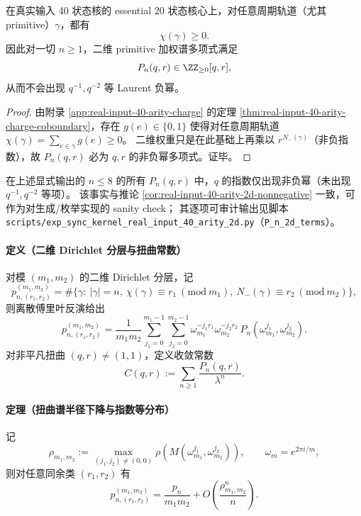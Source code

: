 \begin{corollary}\label{cor:real-input-40-arity-2d-nonnegative}
在真实输入 40 状态核的 essential $20$ 状态核心上，对任意周期轨道（尤其 primitive）\(\gamma\)，都有
\[
\chi(\gamma)\ge 0.
\]
因此对一切 \(n\ge 1\)，二维 primitive 加权谱多项式满足
\[
P_n(q,r)\in\ZZ_{\ge 0}[q,r],
\]
从而不会出现 \(q^{-1},q^{-2}\) 等 Laurent 负幂。
\end{corollary}

\begin{proof}
由附录 \ref{app:real-input-40-arity-charge} 的定理 \ref{thm:real-input-40-arity-charge-coboundary}，存在 \(g(e)\in\{0,1\}\) 使得对任意周期轨道
\(\chi(\gamma)=\sum_{e\in\gamma}g(e)\ge 0\)。
二维权重只是在此基础上再乘以 \(r^{N_-(\gamma)}\)（非负指数），故 \(P_n(q,r)\) 必为 \(q,r\) 的非负幂多项式。证毕。
\end{proof}

\begin{remark}\label{rem:real-input-40-arity-2d-nonneg-evidence}
在上述显式输出的 \(n\le 8\) 的所有 \(P_n(q,r)\) 中，\(q\) 的指数仅出现非负幂（未出现 \(q^{-1},q^{-2}\) 等项）。
该事实与推论 \ref{cor:real-input-40-arity-2d-nonnegative} 一致，可作为对生成/枚举实现的 sanity check；
其逐项可审计输出见脚本 \texttt{scripts/exp\_sync\_kernel\_real\_input\_40\_arity\_2d.py}（\texttt{P\_n\_2d\_terms}）。
\end{remark}
\paragraph{定义（二维 Dirichlet 分层与扭曲常数）}
对模 $(m_1,m_2)$ 的二维 Dirichlet 分层，记
\[
p_{n,(r_1,r_2)}^{(m_1,m_2)}
=\#\{\gamma:\ |\gamma|=n,\ \chi(\gamma)\equiv r_1\ (\mathrm{mod}\ m_1),\ N_-(\gamma)\equiv r_2\ (\mathrm{mod}\ m_2)\},
\]
则离散傅里叶反演给出
\[
p_{n,(r_1,r_2)}^{(m_1,m_2)}
=\frac{1}{m_1m_2}\sum_{j_1=0}^{m_1-1}\sum_{j_2=0}^{m_2-1}
\omega_{m_1}^{-j_1r_1}\omega_{m_2}^{-j_2r_2}\,P_n(\omega_{m_1}^{j_1},\omega_{m_2}^{j_2}).
\]
对非平凡扭曲 $(q,r)\neq(1,1)$，定义收敛常数
\[
C(q,r):=\sum_{n\ge 1}\frac{P_n(q,r)}{\lambda^n}.
\]
\paragraph{定理（扭曲谱半径下降与指数等分布）}
记
\[
\rho_{m_1,m_2}:=\max_{(j_1,j_2)\neq(0,0)}\rho\!\left(M(\omega_{m_1}^{j_1},\omega_{m_2}^{j_2})\right),
\qquad \omega_m=e^{2\pi i/m},
\]
则对任意同余类 $(r_1,r_2)$ 有
\[
p_{n,(r_1,r_2)}^{(m_1,m_2)}=\frac{p_n}{m_1m_2}+O\!\left(\frac{\rho_{m_1,m_2}^n}{n}\right).
\]

